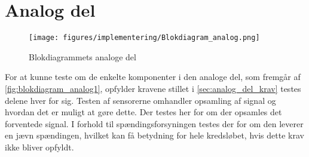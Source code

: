 \section{Analog del}
\begin{figure}[H]
\centering
\texttt{[image: figures/implementering/Blokdiagram\_analog.png]}
\caption{Blokdiagrammets analoge del}
\label{fig:blokdiagram_analog1}
\end{figure}


For at kunne teste om de enkelte komponenter i den analoge del, som fremgår af \autoref{fig:blokdiagram_analog1}, opfylder kravene stillet i \autoref{sec:analog_del_krav} testes delene hver for sig. Testen af sensorerne omhandler opsamling af signal og hvordan det er muligt at gøre dette. Der testes her for om der opsamles det forventede signal. I forhold til spændingsforsyningen testes der for om den leverer en jævn spændingen, hvilket kan få betydning for hele kredsløbet, hvis dette krav ikke bliver opfyldt.